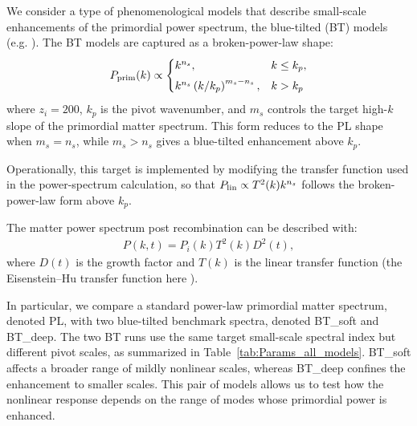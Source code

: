 \documentclass[
 reprint,
 superscriptaddress,
 nofootinbib,
 nobibnotes,
 amsmath,
 amssymb,
 aps,
 prd,
 floatfix,
 longbibliography
]{revtex4-2}
\begin{document}
We consider a type of phenomenological models that describe small-scale enhancements of the primordial power spectrum, the blue-tilted (BT) models (e.g. \cite{Hira24bluetilt,Dekker25DwarfPPS}). The BT models are captured as a broken-power-law shape:
\begin{equation}
    \label{eq:bt_input_power}
    P_{\rm prim}(k)
    \propto
    \begin{cases}
        k^{n_s}, & k \le k_p,\\[4pt]
        k^{n_s}\left(k/k_p\right)^{m_s-n_s}, & k > k_p
    \end{cases}
\end{equation}
where \(z_i=200\), \(k_p\) is the pivot wavenumber, and $m_s$ controls the target high-\(k\) slope of the primordial matter spectrum. This form reduces to the PL shape when \(m_s=n_s\), while \(m_s>n_s\) gives a blue-tilted enhancement above \(k_p\). 

Operationally, this target is implemented by modifying the transfer function used in the power-spectrum calculation, so that \(P_{\rm lin}\propto T^2(k)k^{n_s}\) follows the broken-power-law form above \(k_p\). 

The matter power spectrum post recombination can be described with:
\begin{align}
    P(k,t) = P_i(k) T^2(k) D^2(t),
    \label{eq:P_MD}
\end{align}
where $D(t)$ is the growth factor and  $T(k)$ is the linear transfer function (the Eisenstein--Hu transfer function here \citep{Eisenstein1998}).




In particular, we compare a standard power-law primordial matter spectrum, denoted PL, with two blue-tilted benchmark spectra, denoted BT\_soft and BT\_deep. The two BT runs use the same target small-scale spectral index but different pivot scales, as summarized in Table~\ref{tab:Params_all_models}. BT\_soft affects a broader range of mildly nonlinear scales, whereas BT\_deep confines the enhancement to smaller scales. This pair of models allows us to test how the nonlinear response depends on the range of modes whose primordial power is enhanced.
\end{document}
